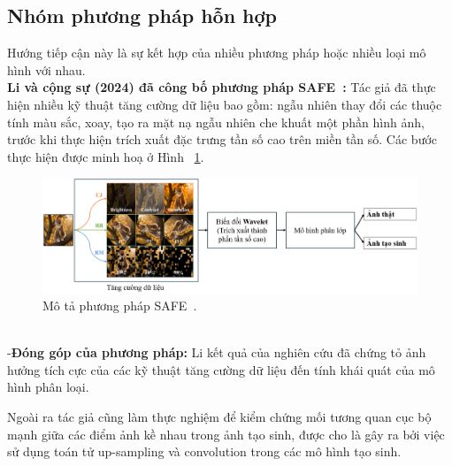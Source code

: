 \subsection{Nhóm phương pháp hỗn hợp}
Hướng tiếp cận này là sự kết hợp của nhiều phương pháp hoặc nhiều loại mô hình với nhau.\\
%
\textbf{Li và cộng sự (2024) đã công bố phương pháp SAFE~\cite{li2024improving}:}
%
Tác giả đã thực hiện nhiều kỹ thuật tăng cường dữ liệu bao gồm: ngẫu nhiên thay đổi các thuộc tính màu sắc, xoay, tạo ra mặt nạ ngẫu nhiên che khuất một phần hình ảnh, trước khi thực hiện trích xuất đặc trưng tần số cao trên miền tần số. Các bước thực hiện được minh hoạ ở Hình ~\ref{fig:model-SAFE-1}. 
%	
\begin{figure}[ht]
	\centering
	\includegraphics[width=1.0\linewidth]{Images/model-SAFE-1.png}	\begin{minipage}{0.9\linewidth}
		\caption{Mô tả phương pháp SAFE~\cite{li2024improving}.}
		\label{fig:model-SAFE-1}
	\end{minipage}
\end{figure}\\
%
%
%
-\textbf{Đóng góp của phương pháp:}
%
Li kết quả của nghiên cứu đã chứng tỏ ảnh hưởng tích cực của các kỹ thuật tăng cường dữ liệu đến tính khái quát của mô hình phân loại.

Ngoài ra tác giả cũng làm thực nghiệm để kiểm chứng mối tương quan cục bộ mạnh giữa các điểm ảnh kề nhau trong ảnh tạo sinh, được cho là gây ra bởi việc sử dụng toán tử \gls{up-sampling} và \gls{convolution} trong các mô hình tạo sinh.
%

%






